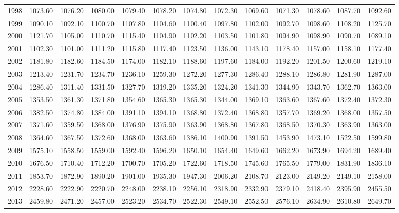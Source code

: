 \begin{longtable}{rrrrrrrrrrrrr}
  1998 & 1073.60 & 1076.20 & 1080.00 & 1079.40 & 1078.20 & 1074.80 & 1072.30 & 1069.60 & 1071.30 & 1078.60 & 1087.70 & 1092.60 \\ 
  1999 & 1090.10 & 1092.10 & 1100.70 & 1107.80 & 1104.60 & 1100.40 & 1097.80 & 1102.00 & 1092.70 & 1098.60 & 1108.20 & 1125.70 \\ 
  2000 & 1121.70 & 1105.00 & 1110.70 & 1115.40 & 1104.90 & 1102.20 & 1103.50 & 1101.80 & 1094.90 & 1098.90 & 1090.70 & 1089.10 \\ 
  2001 & 1102.30 & 1101.00 & 1111.20 & 1115.80 & 1117.40 & 1123.50 & 1136.00 & 1143.10 & 1178.40 & 1157.00 & 1158.10 & 1177.40 \\ 
  2002 & 1181.80 & 1182.60 & 1184.50 & 1174.00 & 1182.10 & 1188.60 & 1197.60 & 1184.00 & 1192.20 & 1201.50 & 1200.60 & 1219.10 \\ 
  2003 & 1213.40 & 1231.70 & 1234.70 & 1236.10 & 1259.30 & 1272.20 & 1277.30 & 1286.40 & 1288.10 & 1286.80 & 1281.90 & 1287.00 \\ 
  2004 & 1286.40 & 1311.40 & 1331.50 & 1327.70 & 1319.20 & 1335.20 & 1324.20 & 1341.30 & 1344.90 & 1343.70 & 1362.70 & 1363.00 \\ 
  2005 & 1353.50 & 1361.30 & 1371.80 & 1354.60 & 1365.30 & 1365.30 & 1344.00 & 1369.10 & 1363.60 & 1367.60 & 1372.40 & 1372.30 \\ 
  2006 & 1382.50 & 1374.80 & 1384.00 & 1391.10 & 1394.10 & 1368.80 & 1372.40 & 1368.80 & 1357.70 & 1369.20 & 1368.00 & 1357.50 \\ 
  2007 & 1371.60 & 1359.50 & 1368.00 & 1376.90 & 1375.90 & 1363.90 & 1368.80 & 1367.80 & 1368.50 & 1370.30 & 1363.90 & 1363.00 \\ 
  2008 & 1364.60 & 1367.50 & 1372.60 & 1368.00 & 1363.60 & 1386.10 & 1400.90 & 1391.50 & 1453.90 & 1473.10 & 1522.50 & 1599.80 \\ 
  2009 & 1575.10 & 1558.50 & 1559.00 & 1592.40 & 1596.20 & 1650.10 & 1654.40 & 1649.60 & 1662.20 & 1673.90 & 1694.20 & 1689.40 \\ 
  2010 & 1676.50 & 1710.40 & 1712.20 & 1700.70 & 1705.20 & 1722.60 & 1718.50 & 1745.60 & 1765.50 & 1779.00 & 1831.90 & 1836.10 \\ 
  2011 & 1853.70 & 1872.90 & 1890.20 & 1901.00 & 1935.30 & 1947.30 & 2006.20 & 2108.70 & 2123.00 & 2149.20 & 2149.10 & 2158.00 \\ 
  2012 & 2228.60 & 2222.90 & 2220.70 & 2248.00 & 2238.10 & 2256.10 & 2318.90 & 2332.90 & 2379.10 & 2418.40 & 2395.90 & 2455.50 \\ 
  2013 & 2459.80 & 2471.20 & 2457.00 & 2523.20 & 2534.70 & 2522.30 & 2549.10 & 2552.50 & 2576.10 & 2634.90 & 2610.80 & 2649.70 \\ 

\end{longtable}
